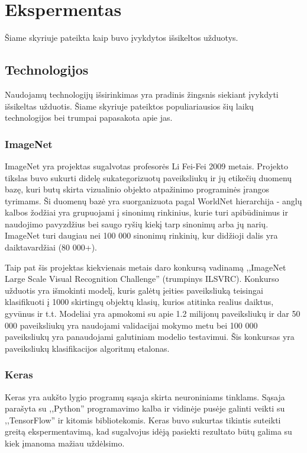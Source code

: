 \documentclass{VUMIFPSkursinis}
\begin{document}
\section{Ekspermentas}
Šiame skyriuje pateikta kaip buvo įvykdytos išsikeltos užduotys.

\subsection{Technologijos}
Naudojamų technologijų išsirinkimas yra pradinis žingsnis siekiant įvykdyti išsikeltas užduotis. Šiame skyriuje pateiktos populiariausios šių laikų technologijos 
bei trumpai papasakota apie jas.

\subsubsection{ImageNet}
ImageNet yra projektas sugalvotas profesorės Li Fei-Fei 2009 metais. Projekto tikslas buvo sukurti didelę sukategorizuotų paveiksliukų ir jų etikečių duomenų bazę, 
kuri butų skirta vizualinio objekto atpažinimo programinės įrangos tyrimams. Ši duomenų bazė yra suorganizuota pagal WorldNet hierarchija - anglų kalbos žodžiai 
yra grupuojami į sinonimų rinkinius, kurie turi apibūdinimus ir naudojimo pavyzdžius bei saugo ryšių kiekį tarp sinonimų arba jų narių. ImageNet turi daugiau nei 
100 000 sinonimų rinkinių, kur didžioji dalis yra daiktavardžiai (80 000+). 

Taip pat šis projektas kiekvienais metais daro konkursą vadinamą ,,ImageNet Large Scale Visual Recognition Challenge'' (trumpinys ILSVRC). Konkurso užduotis yra 
išmokinti modelį, kuris galėtų įeities paveiksliuką teisingai klasifikuoti į 1000 skirtingų objektų klasių, kurios atitinka realius daiktus, gyvūnus ir t.t. Modeliai 
yra apmokomi su apie 1.2 milijonų paveiksliukų ir dar 50 000 paveiksliukų yra naudojami validacijai mokymo metu bei 100 000 paveiksliukų yra panaudojami galutiniam 
modelio testavimui. Šis konkursas yra paveiksliukų klasifikacijos algoritmų etalonas.

\subsubsection{Keras}
Keras yra aukšto lygio programų sąsaja skirta neuroniniams tinklams. Sąsaja parašyta su ,,Python'' programavimo kalba ir vidinėje pusėje galinti veikti su ,,TensorFlow'' 
ir kitomis bibliotekomis. Keras buvo sukurtas tikintis suteikti greitą ekspermentavimą, kad sugalvojus idėją pasiekti rezultato būtų galima su kiek įmanoma mažiau uždėlsimo.
\end{document}
